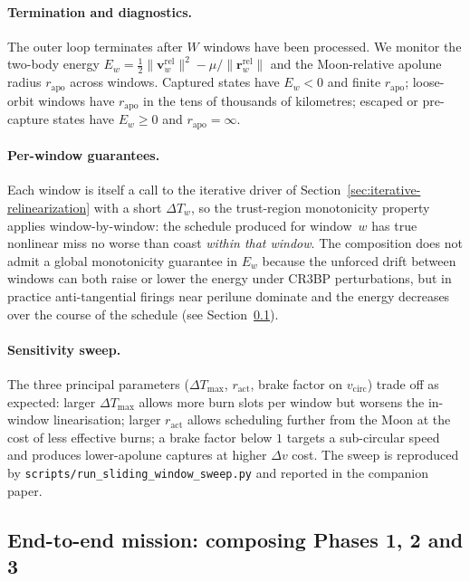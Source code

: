 \documentclass[8pt,a4paper]{article}
\newcommand{\bvec}[1]{\bm{#1}}
\theoremstyle{definition}
\theoremstyle{remark}
\begin{document}
\paragraph{Termination and diagnostics.} The outer loop terminates
after $W$ windows have been processed. We monitor the two-body
energy
$E_w = \tfrac{1}{2}\|\bvec{v}_w^\mathrm{rel}\|^2 -
\mu/\|\bvec{r}_w^\mathrm{rel}\|$
and the Moon-relative apolune radius $r_\mathrm{apo}$ across
windows. Captured states have $E_w < 0$ and finite
$r_\mathrm{apo}$; loose-orbit windows have $r_\mathrm{apo}$ in the
tens of thousands of kilometres; escaped or pre-capture states
have $E_w \ge 0$ and $r_\mathrm{apo} = \infty$.

\paragraph{Per-window guarantees.} Each window is itself a call to
the iterative driver of
Section~\ref{sec:iterative-relinearization} with a short
$\Delta T_w$, so the trust-region monotonicity property applies
window-by-window: the schedule produced for window~$w$ has true
nonlinear miss no worse than coast \emph{within that window}. The
composition does not admit a global monotonicity guarantee in
$E_w$ because the unforced drift between windows can both raise or
lower the energy under CR3BP perturbations, but in practice
anti-tangential firings near perilune dominate and the energy
decreases over the course of the schedule (see
Section~\ref{sec:end-to-end-manual}).

\paragraph{Sensitivity sweep.} The three principal parameters
($\Delta T_\mathrm{max}$, $r_\mathrm{act}$, brake factor on
$v_\mathrm{circ}$) trade off as expected: larger
$\Delta T_\mathrm{max}$ allows more burn slots per window but
worsens the in-window linearisation; larger $r_\mathrm{act}$
allows scheduling further from the Moon at the cost of less
effective burns; a brake factor below $1$ targets a sub-circular
speed and produces lower-apolune captures at higher $\Delta v$
cost. The sweep is reproduced by
\texttt{scripts/run\_sliding\_window\_sweep.py} and reported in
the companion paper.

\subsection{End-to-end mission: composing Phases 1, 2 and 3}\label{sec:end-to-end-manual}
\end{document}
